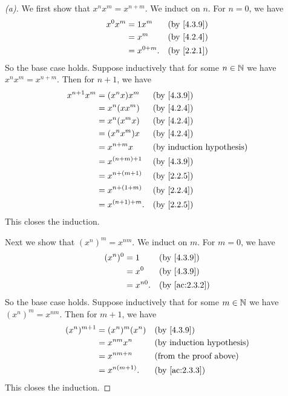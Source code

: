 \begin{proof}[(a)]
  We first show that \(x^n x^m = x^{n + m}\).
  We induct on \(n\).
  For \(n = 0\), we have
  \begin{align*}
    x^0 x^m & = 1 x^m      &  & \by{4.3.9} \\
            & = x^m        &  & \by{4.2.4} \\
            & = x^{0 + m}. &  & \by{2.2.1}
  \end{align*}
  So the base case holds.
  Suppose inductively that for some \(n \in \mathbb{N}\) we have \(x^n x^m = x^{n + m}\).
  Then for \(n + 1\), we have
  \begin{align*}
    x^{n + 1} x^m & = (x^n x) x^m      &  & \by{4.3.9} \\
                  & = x^n (x x^m)      &  & \by{4.2.4} \\
                  & = x^n (x^m x)      &  & \by{4.2.4} \\
                  & = (x^n x^m) x      &  & \by{4.2.4} \\
                  & = x^{n + m} x      &  & \byIH      \\
                  & = x^{(n + m) + 1}  &  & \by{4.3.9} \\
                  & = x^{n + (m + 1)}  &  & \by{2.2.5} \\
                  & = x^{n + (1 + m)}  &  & \by{2.2.4} \\
                  & = x^{(n + 1) + m}. &  & \by{2.2.5}
  \end{align*}
  This closes the induction.

  Next we show that \((x^n)^m = x^{nm}\).
  We induct on \(m\).
  For \(m = 0\), we have
  \begin{align*}
    (x^n)^0 & = 1       &  & \by{4.3.9}    \\
            & = x^0     &  & \by{4.3.9}    \\
            & = x^{n0}. &  & \by{ac:2.3.2}
  \end{align*}
  So the base case holds.
  Suppose inductively that for some \(m \in \mathbb{N}\) we have \((x^n)^m = x^{nm}\).
  Then for \(m + 1\), we have
  \begin{align*}
    (x^n)^{m + 1} & = (x^n)^m (x^n) &  & \by{4.3.9}                    \\
                  & = x^{nm} x^n    &  & \byIH                         \\
                  & = x^{nm + n}    &  & \text{(from the proof above)} \\
                  & = x^{n(m + 1)}. &  & \by{ac:2.3.3}
  \end{align*}
  This closes the induction.


\end{proof}
